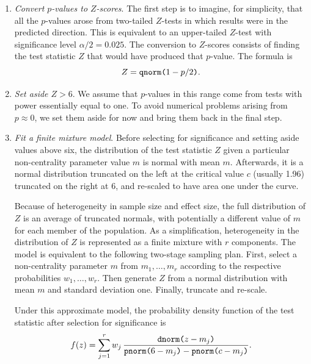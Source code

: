 \documentclass[jou]{apa6} %
\newcommand{\R}[1]{\mbox{\texttt{#1}}} %
\begin{document}
\begin{enumerate}
     \item \emph{Convert $p$-values to $Z$-scores}. The first step is to imagine, for simplicity, that all the $p$-values arose from two-tailed $Z$-tests in which results were in the predicted direction. This is equivalent to an upper-tailed $Z$-test with significance level $\alpha/2 = 0.025$. The conversion to $Z$-scores \parencite{StoufferEtAl1949} consists of finding the test statistic $Z$ that would have produced that $p$-value. The formula is
\begin{equation} \label{Zformula}
    Z = \R{qnorm(}1-p/2\R{)} .
\end{equation}
     \item \emph{Set aside $Z>6$}. We assume that $p$-values in this range come from tests with power essentially equal to one. To avoid numerical problems arising from $p\approx 0$, we set them aside for now and bring them back in the final step.
     \item \label{zfit} \emph{Fit a finite mixture model}. Before selecting  for significance and setting aside values above six, the distribution of the test statistic $Z$ given a particular non-centrality parameter value $m$ is normal with mean $m$. Afterwards, it is a normal distribution truncated on the left at the critical value $c$ (usually 1.96) truncated on the right at 6, and re-scaled to have area one under the curve. 

Because of heterogeneity in sample size and effect size, the full distribution of $Z$ is an average of truncated normals, with potentially a different value of $m$ for each member of the population. As a simplification, heterogeneity in the distribution of $Z$ is represented as a finite mixture with $r$ components. The model is equivalent to the following two-stage sampling plan. First, select a non-centrality parameter $m$ from $m_1, \ldots, m_r$ according to the respective probabilities $w_1, \ldots, w_r$. Then generate $Z$ from a normal distribution with mean $m$ and standard deviation one. Finally, truncate and re-scale. 

Under this approximate model, the probability density function of the test statistic after selection for significance is 
\begin{equation} \label{Zmixture}
    f(z) = \sum_{j=1}^r w_j \, \frac{\R{dnorm(}z-m_j\R{)} }
            { \R{pnorm(}6-m_j\R{)} - \R{pnorm(}c-m_j\R{)} }.
\end{equation} 


\end{enumerate}
\end{document}
